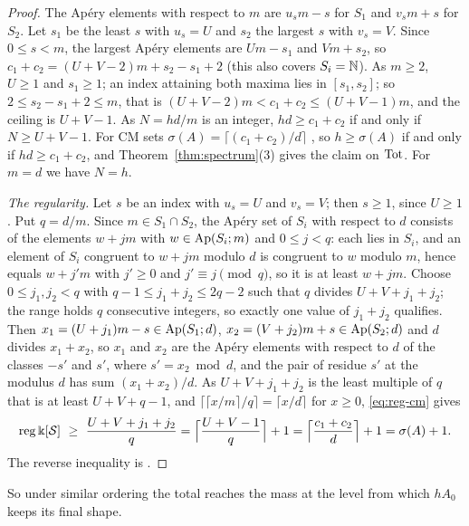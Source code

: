 \begin{proof}
The Ap\'ery elements with respect to $m$ are $u_sm-s$ for $S_1$ and $v_sm+s$ for $S_2$. Let $s_1$ be the least $s$ with $u_s=U$ and $s_2$ the largest $s$ with $v_s=V$. Since $0\le s<m$, the largest Ap\'ery elements are $Um-s_1$ and $Vm+s_2$, so $c_1+c_2=(U+V-2)m+s_2-s_1+2$ (this also covers $S_i=\mathbb{N}$). As $m\ge2$, $U\ge1$ and $s_1\ge1$; an index attaining both maxima lies in $[s_1,s_2]$; so $2\le s_2-s_1+2\le m$, that is $(U+V-2)m<c_1+c_2\le(U+V-1)m$, and the ceiling is $U+V-1$. As $N=hd/m$ is an integer, $hd\ge c_1+c_2$ if and only if $N\ge U+V-1$. For CM sets $\sigma(A)=\lceil(c_1+c_2)/d\rceil$ \cite[Prop.~3.2]{GimenezGonzalezSanchez2023}, so $h\ge\sigma(A)$ if and only if $hd\ge c_1+c_2$, and Theorem~\ref{thm:spectrum}(3) gives the claim on $\operatorname{Tot}$. For $m=d$ we have $N=h$.

\emph{The regularity.} Let $s$ be an index with $u_s=U$ and $v_s=V$; then $s\ge1$, since $U\ge1$. Put $q=d/m$. Since $m\in S_1\cap S_2$, the Ap\'ery set of $S_i$ with respect to $d$ consists of the elements $w+jm$ with $w\in\operatorname{Ap}(S_i;m)$ and $0\le j<q$: each lies in $S_i$, and an element of $S_i$ congruent to $w+jm$ modulo $d$ is congruent to $w$ modulo $m$, hence equals $w+j'm$ with $j'\ge0$ and $j'\equiv j\pmod q$, so it is at least $w+jm$. Choose $0\le j_1,j_2<q$ with $q-1\le j_1+j_2\le2q-2$ such that $q$ divides $U+V+j_1+j_2$; the range holds $q$ consecutive integers, so exactly one value of $j_1+j_2$ qualifies. Then $x_1=(U+j_1)m-s\in\operatorname{Ap}(S_1;d)$, $x_2=(V+j_2)m+s\in\operatorname{Ap}(S_2;d)$ and $d$ divides $x_1+x_2$, so $x_1$ and $x_2$ are the Ap\'ery elements with respect to $d$ of the classes $-s'$ and $s'$, where $s'=x_2\bmod d$, and the pair of residue $s'$ at the modulus $d$ has sum $(x_1+x_2)/d$. As $U+V+j_1+j_2$ is the least multiple of $q$ that is at least $U+V+q-1$, and $\lceil\lceil x/m\rceil/q\rceil=\lceil x/d\rceil$ for $x\ge0$, \eqref{eq:reg-cm} gives
\[
\reg \Bbbk[\mathcal S]\ \ge\ \frac{U+V+j_1+j_2}{q}=\Bigl\lceil\frac{U+V-1}{q}\Bigr\rceil+1=\Bigl\lceil\frac{c_1+c_2}{d}\Bigr\rceil+1=\sigma(A)+1 .
\]
The reverse inequality is \cite[Thm.~3.16]{GimenezGonzalezSanchez2023}.
\end{proof}

So under similar ordering the total reaches the mass at the level from which $hA_0$ keeps its final shape.

